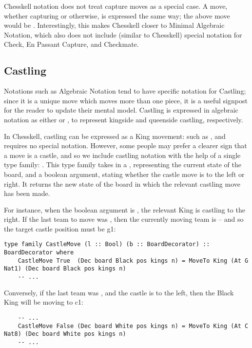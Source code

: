 Chesskell notation does not treat capture moves as a special case. A move, whether capturing or otherwise, is expressed the same way; the above move would be . Interestingly, this makes Chesskell closer to Minimal Algebraic Notation, which also does not include (similar to Chesskell) special notation for Check, En Passant Capture, and Checkmate.

\subsection{Castling} \label{castleextension}

Notations such as Algebraic Notation tend to have specific notation for Castling; since it is a unique move which moves more than one piece, it is a useful signpost for the reader to update their mental model. Castling is expressed in algebraic notation as either  or , to represent kingside and queenside castling, respectively.

In Chesskell, castling can be expressed as a King movement: such as , and requires no special notation. However, some people may prefer a clearer sign that a move is a castle, and so we include castling notation with the help of a single type family: . This type family takes in a , representing the current state of the board, and a boolean argument, stating whether the castle move is to the left or right. It returns the new state of the board in which the relevant castling move has been made.

For instance, when the boolean argument is , the relevant King is castling to the right. If the last team to move was , then the currently moving team is  -- and so the target castle position must be g1:

\begin{lstlisting}
type family CastleMove (l :: Bool) (b :: BoardDecorator) :: BoardDecorator where
    CastleMove True  (Dec board Black pos kings n) = MoveTo King (At G Nat1) (Dec board Black pos kings n)
    -- ...
\end{lstlisting}

Conversely, if the last team was , and the castle is to the left, then the Black King will be moving to c1:

\begin{lstlisting}
    -- ...
    CastleMove False (Dec board White pos kings n) = MoveTo King (At C Nat8) (Dec board White pos kings n)
    -- ...
\end{lstlisting}

